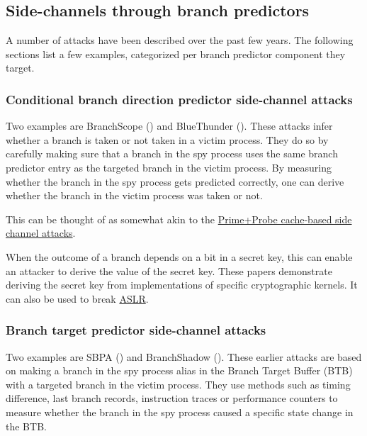 \documentclass[
  a4paper,
]{report}
\begin{document}
\subsection{Side-channels through branch
predictors}\label{side-channels-through-branch-predictors}

A number of attacks have been described over the past few years. The
following sections list a few examples, categorized per branch predictor
component they target.

\subsubsection{Conditional branch direction predictor side-channel
attacks}\label{conditional-branch-direction-predictor-side-channel-attacks}


Two examples are BranchScope () and BlueThunder
(). These
attacks infer whether a branch is taken or not taken in a victim
process. They do so by carefully making sure that a branch in the spy
process uses the same branch predictor entry as the targeted branch in
the victim process. By measuring whether the branch in the spy process
gets predicted correctly, one can derive whether the branch in the
victim process was taken or not.

This can be thought of as somewhat akin to the
\hyperref[primeprobe]{Prime+Probe cache-based side channel attacks}.

When the outcome of a branch depends on a bit in a secret key, this can
enable an attacker to derive the value of the secret key. These papers
demonstrate deriving the secret key from implementations of specific
cryptographic kernels. It can also be used to break
\hyperref[aslr]{ASLR}.

\subsubsection{Branch target predictor side-channel
attacks}\label{branch-target-predictor-side-channel-attacks}


Two examples are SBPA () and BranchShadow
(). These
earlier attacks are based on making a branch in the spy process alias in
the Branch Target Buffer (BTB) with a targeted branch in the
victim process. They use methods such as timing difference, last branch
records, instruction
traces or performance
counters to measure whether the branch in the
spy process caused a specific state change in the BTB.
\end{document}
